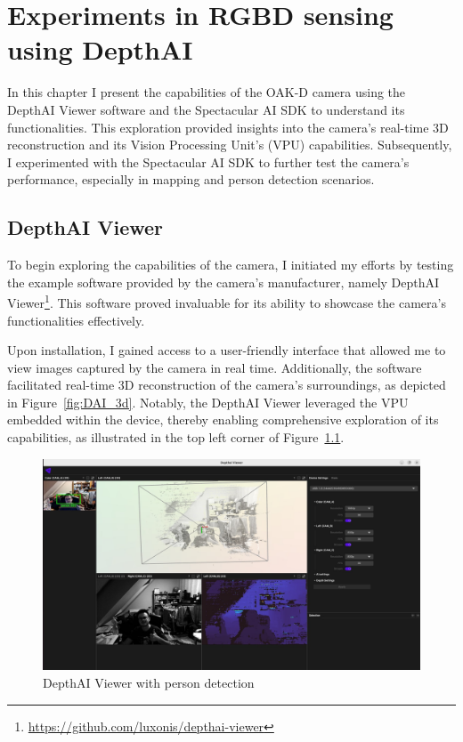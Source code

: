 \chapter{Experiments in RGBD sensing using DepthAI} \label{experiments_oak_d}

In this chapter I present the capabilities of the OAK-D camera using the DepthAI Viewer software and the Spectacular AI SDK to understand its functionalities. This exploration provided insights into the camera's real-time 3D reconstruction and its Vision Processing Unit's (VPU) capabilities. Subsequently, I experimented with the Spectacular AI SDK to further test the camera's performance, especially in mapping and person detection scenarios.


\section{DepthAI Viewer}

To begin exploring the capabilities of the camera, I initiated my efforts by testing the example software provided by the camera's manufacturer, namely DepthAI Viewer\footnote{\url{https://github.com/luxonis/depthai-viewer}}. This software proved invaluable for its ability to showcase the camera's functionalities effectively.

Upon installation, I gained access to a user-friendly interface that allowed me to view images captured by the camera in real time. Additionally, the software facilitated real-time 3D reconstruction of the camera's surroundings, as depicted in Figure~\ref{fig:DAI_3d}. Notably, the DepthAI Viewer leveraged the VPU embedded within the device, thereby enabling comprehensive exploration of its capabilities, as illustrated in the top left corner of Figure~\ref{fig:DAI_person_detection}.

\FloatBarrier
\begin{figure}[htbp]
	\centering
	\includegraphics[width=150mm, keepaspectratio]{figures_jpg/depthai_viewer.jpg}
	\caption{DepthAI Viewer with person detection}
	\label{fig:DAI_person_detection}
\end{figure}

